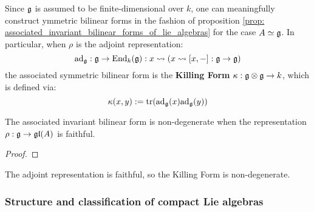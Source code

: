             \begin{example} \label{example: the_killing_form}
                Since $\mathfrak{g}$ is assumed to be finite-dimensional over $k$, one can meaningfully construct ymmetric bilinear forms in the fashion of proposition \ref{prop: associated_invariant_bilinear_forms_of_lie_algebras} for the case $A \simeq \mathfrak{g}$. In particular, when $\rho$ is the adjoint representation:
                    $$\mathrm{ad}_{\mathfrak{g}}: \mathfrak{g} \to \mathrm{End}_k(\mathfrak{g}): x \leadsto \left(x \leadsto [x, -]: \mathfrak{g} \to \mathfrak{g}\right)$$
                the associated symmetric bilinear form is the \textbf{Killing Form} $\kappa: \g \tensor \g \to k$, which is defined via:
                    $$\kappa(x, y) := \operatorname{tr}(\mathrm{ad}_{\mathfrak{g}}(x) \mathrm{ad}_{\mathfrak{g}}(y))$$
            \end{example}
            
            \begin{theorem} \label{theorem: nondegeneracy_of_associated_invariant_bilinear_forms_of_lie_algebras}
                The associated invariant bilinear form is non-degenerate when the representation $\rho: \mathfrak{g} \to \mathfrak{gl}(A)$ is faithful.
            \end{theorem}
                \begin{proof}
                    
                \end{proof}
            \begin{corollary}
                The adjoint representation is faithful, so the Killing Form is non-degenerate. 
            \end{corollary}
                
        \subsubsection{Structure and classification of compact Lie algebras}

